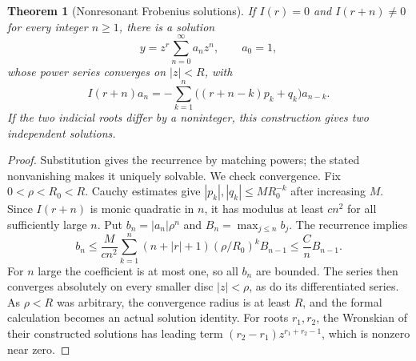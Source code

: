 \documentclass[11pt,oneside]{book}
\newtheorem{theorem}{Theorem}[chapter]
\theoremstyle{definition}
\theoremstyle{remark}\newtheorem{remark}[theorem]{Remark}
\begin{document}
\begin{theorem}[Nonresonant Frobenius solutions]\label{d13:09:frobenius}
If \(I(r)=0\) and \(I(r+n)\ne0\) for every integer \(n\ge1\), there is a
solution
\[
 y=z^r\sum_{n=0}^\infty a_nz^n,\qquad a_0=1,
\]
whose power series converges on \(|z|<R\), with
\[
 I(r+n)a_n
 =-\sum_{k=1}^n\big((r+n-k)p_k+q_k\big)a_{n-k}.
\]
If the two indicial roots differ by a noninteger, this construction gives
two independent solutions.
\end{theorem}
\begin{proof}
Substitution gives the recurrence by matching powers; the stated
nonvanishing makes it uniquely solvable. We check convergence.
Fix \(0<\rho<R_0<R\). Cauchy estimates give
\(|p_k|,|q_k|\le M R_0^{-k}\) after increasing \(M\).
Since \(I(r+n)\) is monic quadratic in \(n\), it has modulus at least
\(c n^2\) for all sufficiently large \(n\). Put \(b_n=|a_n|\rho^n\)
and \(B_n=\max_{j\le n}b_j\). The recurrence implies
\[
 b_n\le \frac{M}{c n^2}
       \sum_{k=1}^n(n+|r|+1)(\rho/R_0)^k B_{n-1}
       \le \frac{C}{n}B_{n-1}.
\]
For \(n\) large the coefficient is at most one, so all \(b_n\) are bounded.
The series then converges absolutely on every smaller disc
\(|z|<\rho\), as do its differentiated series. As \(\rho<R\) was
arbitrary, the convergence radius is at least \(R\), and the formal
calculation becomes an actual solution identity.
For roots \(r_1,r_2\), the Wronskian of their constructed solutions has
leading term \((r_2-r_1)z^{r_1+r_2-1}\), which is nonzero near zero.
\end{proof}
\end{document}
